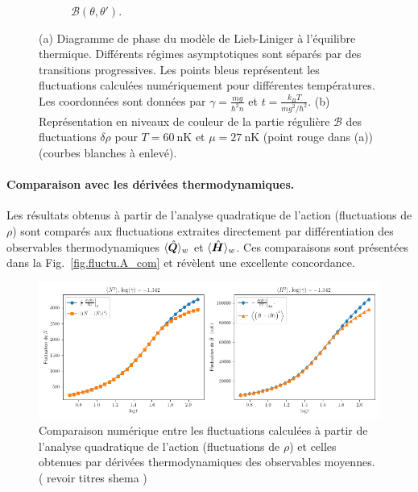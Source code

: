 \begin{figure}[H]
\begin{subfigure}[b]{0.45\textwidth}
		\caption{ \( \mathcal{B}(\theta, \theta') \).}
		\label{chap:4:fig.fluctu.A}
	\end{subfigure}
	\caption{(a) Diagramme de phase du modèle de Lieb-Liniger à l’équilibre thermique. Différents régimes asymptotiques sont séparés par des transitions progressives. Les points bleus représentent les fluctuations calculées numériquement pour différentes températures. Les coordonnées sont données par \( \gamma = \frac{m g}{\hbar^2 n} \) et \( t = \frac{k_B T}{m g^2/\hbar^2} \). (b) Représentation en niveaux de couleur de la partie régulière $\mathcal{B}$ des fluctuations \( \delta \rho \) pour \( T = 60~\mathrm{nK} \) et \( \mu = 27~\mathrm{nK} \) (point rouge dans (a)){\color{red} (courbes blanches à enlevé)}.}
	\label{chap:4:fig:diag_fig}
\end{figure}

\paragraph{Comparaison avec les dérivées thermodynamiques.}

Les résultats obtenus à partir de l’analyse quadratique de l’action (fluctuations de \( \rho \)) sont comparés aux fluctuations extraites directement par différentiation des observables thermodynamiques \( \langle \hat{\bm{Q}} \rangle_w \) et \( \langle \hat{\bm{H}} \rangle_w \). Ces comparaisons sont présentées dans la Fig.~\ref{fig.fluctu.A_com} et révèlent une excellente concordance.


\begin{figure}[H]
	\centering
	\includegraphics[width=1\textwidth]{figures/04_GGE_Fluctuation/fluctuations_plot_log_gamma=-1.342.png}	
	\caption{Comparaison numérique entre les fluctuations calculées à partir de l’analyse quadratique de l’action (fluctuations de \( \rho \)) et celles obtenues par dérivées thermodynamiques des observables moyennes.{\color{red} ( revoir titres shema )} }
	\label{chap:4:fig.fluctu.A_com}
\end{figure}



